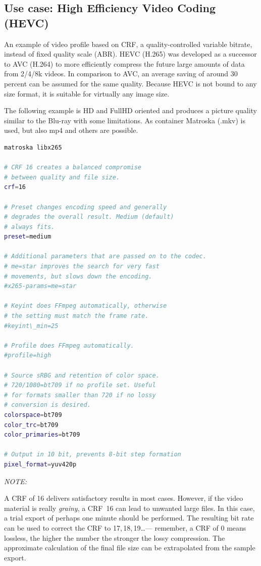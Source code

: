 \subsection{Use case: High Efficiency Video Coding (HEVC)}%
\label{sub:use_case_hevc}

An example of video profile based on CRF, a quality-controlled
variable bitrate, instead of fixed quality scale (ABR).
HEVC (H.265) was developed as a successor to AVC (H.264) to more
efficiently compress the future large amounts of data from 2/4/8k
videos.
In comparison to AVC, an average saving of around 30 percent can be
assumed for the same quality.
Because HEVC is not bound to any size format, it is suitable for
virtually any image size.

The following example is HD and FullHD oriented and produces a
picture quality similar to the Blu-ray with some limitations.
As container Matroska (.mkv) is used, but also mp4 and others are
possible.

\vspace{2ex} \begin{lstlisting}[language=bash,numbers=none]
matroska libx265

# CRF 16 creates a balanced compromise
# between quality and file size. 
crf=16

# Preset changes encoding speed and generally
# degrades the overall result. Medium (default)
# always fits.
preset=medium

# Additional parameters that are passed on to the codec.
# me=star improves the search for very fast
# movements, but slows down the encoding.
#x265-params=me=star

# Keyint does FFmpeg automatically, otherwise
# the setting must match the frame rate.
#keyint\_min=25

# Profile does FFmpeg automatically.
#profile=high

# Source sRBG and retention of color space.
# 720/1080=bt709 if no profile set. Useful
# for formats smaller than 720 if no lossy
# conversion is desired.
colorspace=bt709
color_trc=bt709
color_primaries=bt709

# Output in 10 bit, prevents 8-bit step formation
pixel_format=yuv420p
\end{lstlisting}

\noindent \textit{NOTE:}

A CRF of 16 delivers satisfactory results in most cases. However, if
the video material is really \emph{grainy}, a CRF~16 can lead to unwanted large files.  In this case, a trial export of perhaps one minute should be performed. The resulting bit rate can be used to correct the CRF to 17,\,18,\,19\ldots --- remember, a CRF of 0 means lossless, the higher the number the stronger the lossy compression. The approximate calculation of the final file size can be extrapolated from the sample export.

